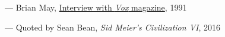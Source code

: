 \vspace{0.0cm}
\hspace{4cm} --- Brian May, {\hypersetup{urlcolor=black}\href{https://brianmay.com/brian/magsandpress/voxmar91/voxmar91.html}{Interview with \textit{Vox} magazine}}, 1991

\vspace{0.2cm}
\hspace{4cm} --- Quoted by Sean Bean, \textit{Sid Meier's Civilization VI}, 2016


